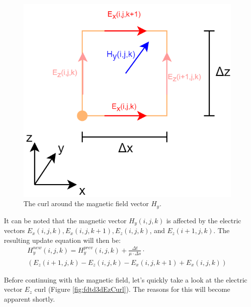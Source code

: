 \begin{figure}[h!]
	\centering
	\includegraphics[scale=0.5]{Figures/fdtd3dHyCurl}
	\decoRule
	\caption[3D $H_y$ vector curl]{The curl around the magnetic field vector $H_y$.}
	\label{fig:fdtd3dHyCurl}
\end{figure}

It can be noted that the magnetic vector $H_y(i,j,k)$ is affected by the electric vectors $E_x(i,j,k), E_x(i,j,k+1), E_z(i,j,k)$, and $E_z(i+1,j,k)$. The resulting update equation will then be:
\begin{multline}
	\label{eqn:3dHyCurlFinal}
	H_y^{new}(i,j,k) =  H_y^{prev}(i,j,k) + \frac{\Delta t}{\mu \cdot \Delta s} \cdot \\ (E_z(i+1,j,k) - E_z(i,j,k) - E_x(i,j,k+1) + E_x(i,j,k))
\end{multline}

Before continuing with the magnetic field, let's quickly take a look at the electric vector $E_z$ curl (Figure \ref{fig:fdtd3dEzCurl}). The reasons for this will become apparent shortly.

